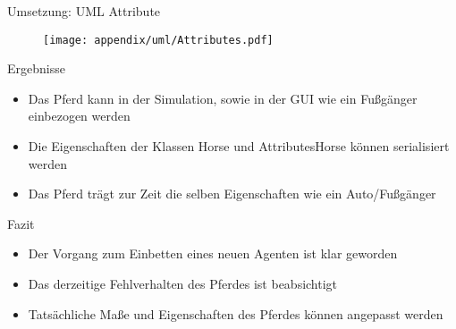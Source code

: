 \begin{frame}{Umsetzung: UML Attribute}
	\begin{figure}
		\texttt{[image: appendix/uml/Attributes.pdf]}
	\end{figure}
\end{frame}

\begin{frame}{Ergebnisse}
	\begin{itemize}
		\item	Das Pferd kann in der Simulation, sowie in der GUI wie ein Fußgänger einbezogen werden
		\item Die Eigenschaften der Klassen Horse und AttributesHorse können serialisiert werden
		\item Das Pferd trägt zur Zeit die selben Eigenschaften wie ein Auto/Fußgänger
	\end{itemize}
\end{frame}

\begin{frame}{Fazit}
	\begin{itemize}
		\item Der Vorgang zum Einbetten eines neuen Agenten ist klar geworden
		\item Das derzeitige Fehlverhalten des Pferdes ist beabsichtigt
		\item Tatsächliche Maße und Eigenschaften des Pferdes können angepasst werden
	\end{itemize}
\end{frame}
